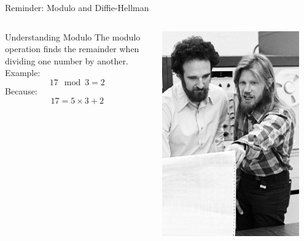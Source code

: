 \documentclass{beamer}
\begin{document}
\begin{frame}{Reminder: Modulo and Diffie-Hellman}
    \begin{columns}
        \begin{block}{Understanding Modulo}
            The modulo operation finds the remainder when dividing one number by another.\\
            Example:
            \[
            17 \mod 3 = 2
            \]
            Because:
            \[
            17 = 5 \times 3 + 2
            \]
        \end{block}
       
        \centering
        \includegraphics[width=0.9\textwidth]{diffiehellman.jpg}
    \end{columns}
\end{frame}
\end{document}
